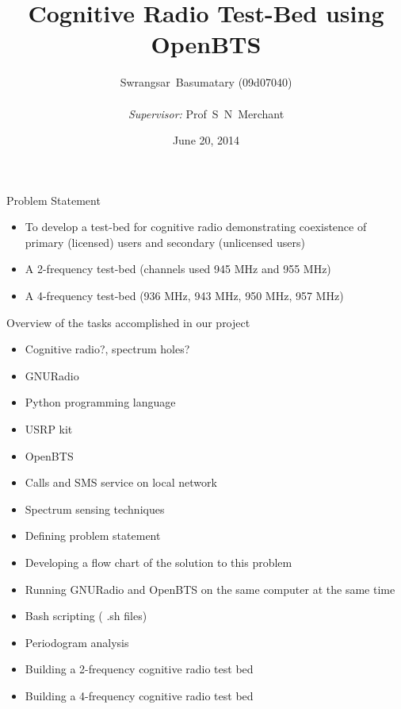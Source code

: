 \documentclass{beamer}
\begin{document}
\title{\bfseries Cognitive Radio Test-Bed using OpenBTS}
\author{Swrangsar~Basumatary (09d07040) \\
~\\
\emph{\footnotesize{Supervisor:}} Prof~S~N~Merchant}
\date{June 20, 2014}


\frame{\titlepage}


	\begin{frame}{Problem Statement}
    	\begin{itemize}
    		\item To develop a test-bed for cognitive radio demonstrating coexistence of primary (licensed) users and secondary (unlicensed users)
    		\item A 2-frequency test-bed (channels used 945 MHz and 955 MHz)
    		\item A 4-frequency test-bed (936 MHz, 943 MHz, 950 MHz, 957 MHz)
    	\end{itemize}
	\end{frame}
	
	\begin{frame}{Overview of the tasks accomplished in our project}
		\begin{itemize}
      \item Cognitive radio?,  spectrum holes?
      \item GNURadio
      \item Python programming language
      \item USRP kit
      \item OpenBTS
      \item Calls and SMS service on local network
      \item Spectrum sensing techniques
      \item Defining problem statement
    \end{itemize}
  \end{frame}
    
    \begin{frame}{}
        \begin{itemize}
		\item Developing a flow chart of the solution to this problem
		\item Running GNURadio and OpenBTS  on the same computer at the same time
		\item Bash scripting ( .sh files)
		\item Periodogram analysis
		\item Building a 2-frequency cognitive radio test bed
		\item Building a 4-frequency cognitive radio test bed
		\end{itemize}
	\end{frame}
	
\end{document}
